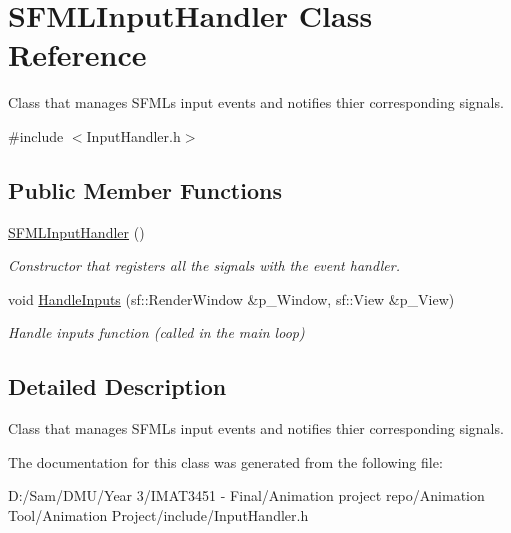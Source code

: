 \hypertarget{class_s_f_m_l_input_handler}{}\section{S\+F\+M\+L\+Input\+Handler Class Reference}
\label{class_s_f_m_l_input_handler}


Class that manages S\+F\+ML\textquotesingle{}s input events and notifies thier corresponding signals.  




{\ttfamily \#include $<$Input\+Handler.\+h$>$}

\subsection*{Public Member Functions}
\begin{DoxyCompactItemize}
\item 
\mbox{\label{class_s_f_m_l_input_handler_a9e66d308027154e6716957e35b5ec2eb}} 
\hyperlink{class_s_f_m_l_input_handler_a9e66d308027154e6716957e35b5ec2eb}{S\+F\+M\+L\+Input\+Handler} ()
\begin{DoxyCompactList}\small\item\em Constructor that registers all the signals with the event handler. \end{DoxyCompactList}\item 
\mbox{\label{class_s_f_m_l_input_handler_ae57aa5ce6009abe49a0dd12f3b27e5fd}} 
void \hyperlink{class_s_f_m_l_input_handler_ae57aa5ce6009abe49a0dd12f3b27e5fd}{Handle\+Inputs} (sf\+::\+Render\+Window \&p\+\_\+\+Window, sf\+::\+View \&p\+\_\+\+View)
\begin{DoxyCompactList}\small\item\em Handle inputs function (called in the main loop) \end{DoxyCompactList}\end{DoxyCompactItemize}


\subsection{Detailed Description}
Class that manages S\+F\+ML\textquotesingle{}s input events and notifies thier corresponding signals. 

The documentation for this class was generated from the following file\+:\begin{DoxyCompactItemize}
\item 
D\+:/\+Sam/\+D\+M\+U/\+Year 3/\+I\+M\+A\+T3451 -\/ Final/\+Animation project repo/\+Animation Tool/\+Animation Project/include/Input\+Handler.\+h\end{DoxyCompactItemize}
